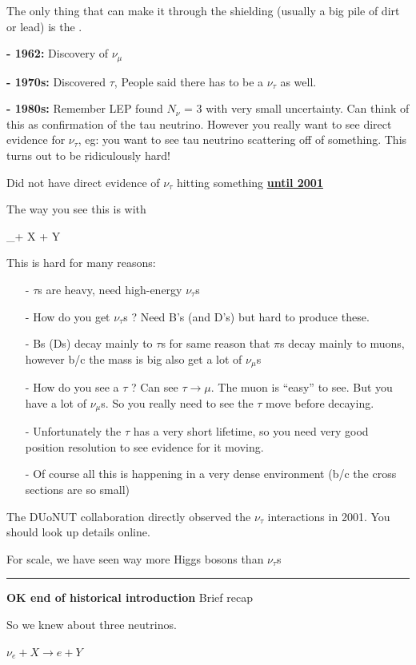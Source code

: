 {The only thing that can make it through the shielding (usually a big pile of dirt or lead) is the \nus.

\textbf{- 1962:} Discovery of $\nu_\mu$

\textbf{- 1970s:} Discovered $\tau$, People said there has to be a $\nu_\tau$ as well. 

\textbf{- 1980s:} Remember LEP found $N_\nu$ = 3 with very small uncertainty.  
Can think of this as confirmation of the tau neutrino.  
However you really want to see direct evidence for $\nu_\tau$, eg: you want to see tau neutrino scattering off of something. 
This turns out to be ridiculously hard! 

Did not have direct evidence of $\nu_\tau$ hitting something \textbf{\underline{until 2001}}


The way you see this is with

\be
\nu_\tau + X \rightarrow \tau + Y 
\ee

This is hard for many reasons:
\begin{itemize}
\item[-] $\tau$s are heavy, need high-energy $\nu_\tau$s
\item[-] How do you get $\nu_\tau$s ? Need B's (and D's) but hard to produce these. 
\item[-] Bs (Ds) decay mainly to $\tau$s for same reason that $\pi$s decay mainly to muons, however b/c the mass is big also get a lot of $\nu_\mu$s
\item[-] How do you see a  $\tau$ ? Can see $\tau \rightarrow \mu$. The muon is ``easy'' to see. But you have a lot of $\nu_\mu$s. So you really need to see the $\tau$ move before decaying.
\item[-] Unfortunately the $\tau$ has a very short lifetime, so you need very good position resolution to see evidence for it moving. 
\item[-] Of course all this is happening in a very dense environment (b/c the cross sections are so small) 
\end{itemize}

The DUoNUT collaboration directly observed the $\nu_\tau$ interactions in 2001. 
You should look up details online. 

For scale, we have seen way more Higgs bosons than $\nu_\tau$s

\noindent\rule{\textwidth}{1pt}

\textbf{OK end of historical introduction} Brief recap

So we knew about three neutrinos. 
\begin{center}
$\nu_e + X  \rightarrow e + Y $


\end{center}}
